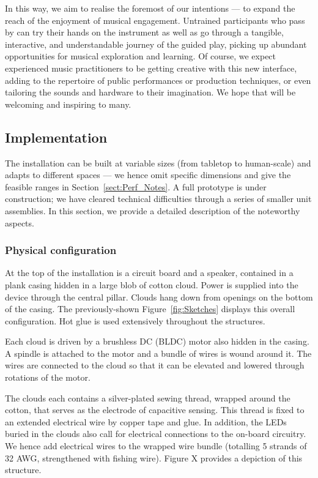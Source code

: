\documentclass{nimemusic}
\begin{document}
In this way, we aim to realise the foremost of our intentions --- to expand the reach of the enjoyment of musical engagement. Untrained participants who pass by can try their hands on the instrument as well as go through a tangible, interactive, and understandable journey of the guided play, picking up abundant opportunities for musical exploration and learning. Of course, we expect experienced music practitioners to be getting creative with this new interface, adding to the repertoire of public performances or production techniques, or even tailoring the sounds and hardware to their imagination. We hope that \CuHum{} will be welcoming and inspiring to many.

\subsection{Implementation}
The installation can be built at variable sizes (from tabletop to human-scale) and adapts to different spaces --- we hence omit specific dimensions and give the feasible ranges in Section~\ref{sect:Perf_Notes}. A full prototype is under construction; we have cleared technical difficulties through a series of smaller unit assemblies. In this section, we provide a detailed description of the noteworthy aspects.

\subsubsection{Physical configuration}
At the top of the installation is a circuit board and a speaker, contained in a plank casing hidden in a large blob of cotton cloud. Power is supplied into the device through the central pillar. Clouds hang down from openings on the bottom of the casing. The previously-shown Figure~\ref{fig:Sketches} displays this overall configuration. Hot glue is used extensively throughout the structures.

Each cloud is driven by a brushless DC (BLDC) motor also hidden in the casing. A spindle is attached to the motor and a bundle of wires is wound around it. The wires are connected to the cloud so that it can be elevated and lowered through rotations of the motor.

The clouds each contains a silver-plated sewing thread, wrapped around the cotton, that serves as the electrode of capacitive sensing. This thread is fixed to an extended electrical wire by copper tape and glue. In addition, the LEDs buried in the clouds also call for electrical connections to the on-board circuitry. We hence add electrical wires to the wrapped wire bundle (totalling 5 strands of 32 AWG, strengthened with fishing wire). Figure X provides a depiction of this structure.
\end{document}
